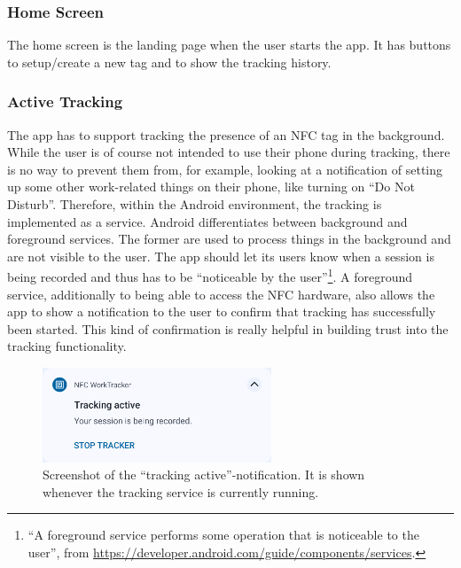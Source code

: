 \documentclass[conference]{IEEEtran}
\newcommand{\phonescreenwidth}{2.69in}
\begin{document}
\subsubsection{Home Screen}
The home screen is the landing page when the user starts the app. It has buttons to setup/create a new tag and to show the tracking history.

\subsubsection{Active Tracking}
The app has to support tracking the presence of an NFC tag in the background. While the user is of course not intended to use their phone during tracking, there is no way to prevent them from, for example, looking at a notification of setting up some other work-related things on their phone, like turning on ``Do Not Disturb''. Therefore, within the Android environment, the tracking is implemented as a service. Android differentiates between background and foreground services. The former are used to process things in the background and are not visible to the user. The app should let its users know when a session is being recorded and thus has to be ``noticeable by the user''\footnote{``A foreground service performs some operation that is noticeable to the user'', from \url{https://developer.android.com/guide/components/services}.}. A foreground service, additionally to being able to access the NFC hardware, also allows the app to show a notification to the user to confirm that tracking has successfully been started. This kind of confirmation is really helpful in building trust into the tracking functionality.

\begin{figure}
	\centering
	\includegraphics[width=\phonescreenwidth]{notification.png}
	\caption{Screenshot of the ``tracking active''-notification. It is shown whenever the tracking service is currently running.}
	\label{fig:notification}
\end{figure}
\end{document}

